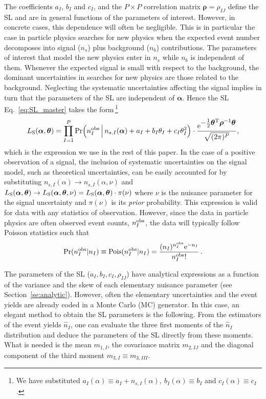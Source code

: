 \documentclass[11pt]{article}
\newcommand{\be}{\begin{equation}}
\newcommand{\ee}{\end{equation}}
\begin{document}
The coefficients $a_I$, $b_I$ and $c_I$, and the $P\times P$ correlation matrix $\bm{\rho}=\rho_{IJ}$ define the SL and are in general functions of the parameters of interest. However, in concrete cases, this dependence will often be negligible. This is in particular the case in particle physics searches for new physics when the expected event number decomposes into signal ($n_s$) plus background ($n_b$) contributions. The parameters of interest that model the new physics enter in $n_s$ while $n_b$ is independent of them.  Whenever the expected signal is small with respect to the background, the dominant uncertainties in searches for new physics are those related to the background.
Neglecting the systematic uncertainties affecting the signal implies in turn that the parameters of the SL are independent of $\bm \alpha$. Hence the SL Eq.~\eqref{eq:SL_master} takes the form\,\footnote{We have substituted
$a_I(\alpha) \equiv a_I+n_{s,I}(\alpha),~b_I(\alpha) \equiv b_I$ and $c_I(\alpha)\equiv c_I$.}
\begin{equation}
 L_{\rm{S}}(\bm{\alpha},\bm{\theta})=
\prod_{I=1}^P \mathrm{Pr}\Big( n^{\rm obs}_I \, \Big| \, n_{s,I}(\bm{\alpha})+a_I+ b_I\theta_I+c_I\theta_I^2  \Big) \cdot
\frac{ \mathrm{e}^{ \textstyle-\frac{1}{2}\bm{\theta}^\mathrm{T} \bm{\rho}^{-1} \bm{\theta} }}{\sqrt{(2\pi)^P}},
\label{eq:SL_LHC}
\end{equation}
which is the expression we use in the rest of this paper. In the case of a positive observation of a signal, the inclusion of systematic uncertainties on the signal 
model, such as theoretical uncertainties, can be easily accounted for by substituting $n_{s,I}(\alpha)\rightarrow n_{s,I}(\alpha,\nu)$ and 
$L_{\rm{S}}(\bm{\alpha},\bm{\theta}) \rightarrow  L_{\rm{S}}(\bm{\alpha},\bm{\theta},\nu) = L_{\rm{S}}(\bm{\alpha},\bm{\theta})\cdot\pi(\nu)$ where $\nu$ is the 
nuisance parameter for the signal uncertainty and $\pi(\nu)$ is its \emph{prior} probability. 
This expression is valid for data with any statistics of observation. However, since the data in particle physics are often observed event counts, $n_{I}^{\rm{obs}}$, the data will typically follow Poisson statistics such that
\be
\textrm{Pr}(n^{\rm obs}_{I}|n_{I})\equiv \textrm{Pois}({n}^{\rm{obs}}_{I}|n_{I}) = \dfrac{(n_{I})^{{n}^{\rm{obs}}_{I}} \mathrm{e}^{-n_{I}}}{{n}^{\rm{obs}}_{I}!} \, .
\ee

The parameters of the SL ($a_I, b_I, c_I, \rho_{IJ}$) have analytical expressions
as a function of the variance and the skew  of each elementary nuisance parameter (see Section~\ref{se:analytic}). However, often the elementary uncertainties and the event yields are already coded in a Monte Carlo (MC) generator. In this case, an elegant method to obtain the SL parameters  is the following. From the estimators of the event yields $\hat n_I$, one can evaluate the three first moments of the $\hat n_I$ distribution and deduce the parameters of the SL directly from these moments.
What is needed is the mean $m_{1,I}$, the covariance matrix $m_{2,IJ}$ and the diagonal component of the third moment $m_{3,I} \equiv m_{3,III}$. 
\end{document}
